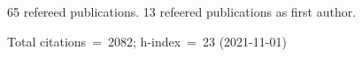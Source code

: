 65 refereed publications. 13 refeered publications as first author.

Total citations~=~2082; h-index~=~23 (2021-11-01)
